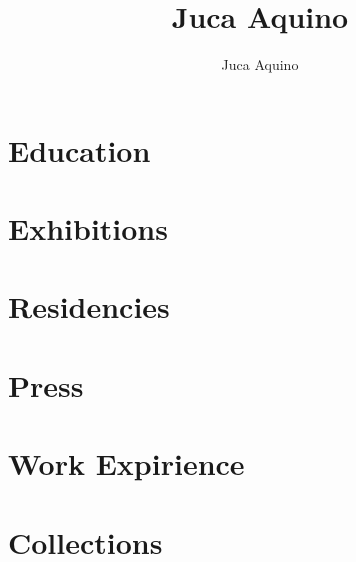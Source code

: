 \documentclass{article}
\begin{document}
\title{Juca Aquino}
\author{Juca Aquino}

\maketitle

\section{Education}

\section{Exhibitions}

\section{Residencies}

\section{Press}

\section{Work Expirience}

\section{Collections}
\end{document}
